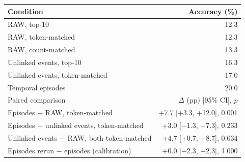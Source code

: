 \begin{tabular}{lr}
\toprule
Condition & Accuracy (\%) \\
\midrule
RAW, top-10 & 12.3 \\
RAW, token-matched & 12.3 \\
RAW, count-matched & 13.3 \\
Unlinked events, top-10 & 16.3 \\
Unlinked events, token-matched & 17.0 \\
Temporal episodes & 20.0 \\
\midrule
Paired comparison & $\Delta$ (pp) [95\% CI], $p$ \\
\midrule
Episodes $-$ RAW, token-matched & +7.7 [+3.3, +12.0], 0.001 \\
Episodes $-$ unlinked events, token-matched & +3.0 [$-$1.3, +7.3], 0.233 \\
Unlinked events $-$ RAW, both token-matched & +4.7 [+0.7, +8.7], 0.034 \\
Episodes rerun $-$ episodes (calibration) & +0.0 [$-$2.3, +2.3], 1.000 \\
\bottomrule
\end{tabular}
